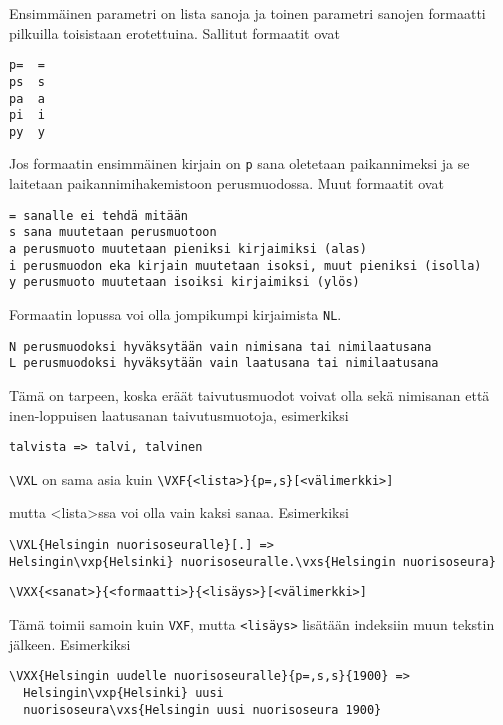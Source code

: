 \documentclass[12pt]{article}
\begin{document}
Ensimmäinen parametri on lista sanoja ja toinen parametri sanojen
formaatti pilkuilla toisistaan erotettuina. Sallitut formaatit ovat

\begin{verbatim}
p=  =
ps  s
pa  a
pi  i
py  y
\end{verbatim}

Jos formaatin ensimmäinen kirjain on \verb=p= sana oletetaan
paikannimeksi ja se laitetaan paikannimihakemistoon perusmuodossa.
Muut formaatit ovat

\begin{verbatim}
= sanalle ei tehdä mitään
s sana muutetaan perusmuotoon
a perusmuoto muutetaan pieniksi kirjaimiksi (alas)
i perusmuodon eka kirjain muutetaan isoksi, muut pieniksi (isolla)
y perusmuoto muutetaan isoiksi kirjaimiksi (ylös)
\end{verbatim}

Formaatin lopussa voi olla jompikumpi kirjaimista \verb=NL=.

\begin{verbatim}
N perusmuodoksi hyväksytään vain nimisana tai nimilaatusana
L perusmuodoksi hyväksytään vain laatusana tai nimilaatusana
\end{verbatim}

Tämä on tarpeen, koska eräät taivutusmuodot voivat olla sekä nimisanan
että inen-loppuisen laatusanan taivutusmuotoja, esimerkiksi

\verb|talvista => talvi, talvinen|


\verb=\VXL= on sama asia kuin \verb|\VXF{<lista>}{p=,s}[<välimerkki>]|

mutta <lista>ssa voi olla vain kaksi sanaa. Esimerkiksi

\begin{verbatim}
\VXL{Helsingin nuorisoseuralle}[.] =>
Helsingin\vxp{Helsinki} nuorisoseuralle.\vxs{Helsingin nuorisoseura}
\end{verbatim}


\begin{verbatim}
\VXX{<sanat>}{<formaatti>}{<lisäys>}[<välimerkki>]
\end{verbatim}

Tämä toimii samoin kuin \verb|VXF|, mutta \verb|<lisäys>| lisätään indeksiin muun
tekstin jälkeen. Esimerkiksi

\begin{verbatim}
\VXX{Helsingin uudelle nuorisoseuralle}{p=,s,s}{1900} =>
  Helsingin\vxp{Helsinki} uusi
  nuorisoseura\vxs{Helsingin uusi nuorisoseura 1900}
\end{verbatim}
\end{document}
